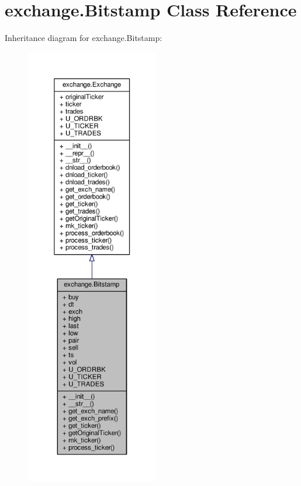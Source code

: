 \hypertarget{classexchange_1_1_bitstamp}{}\section{exchange.\+Bitstamp Class Reference}
\label{classexchange_1_1_bitstamp}


Inheritance diagram for exchange.\+Bitstamp\+:\nopagebreak
\begin{figure}[H]
\begin{center}
\leavevmode
\includegraphics[height=550pt]{classexchange_1_1_bitstamp__inherit__graph}
\end{center}
\end{figure}


